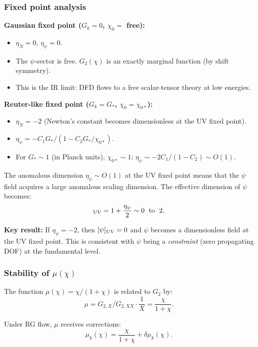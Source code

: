 \documentclass[11pt,a4paper]{article}
\begin{document}
\subsubsection{Fixed point analysis}

\textbf{Gaussian fixed point ($G_k = 0$, $\chi_0 = $ free):}
\begin{itemize}
\item $\eta_N = 0$, $\eta_\psi = 0$.
\item The $\psi$-sector is free. $G_2(\chi)$ is an exactly marginal function (by shift symmetry).
\item This is the IR limit: DFD flows to a free scalar-tensor theory at low energies.
\end{itemize}

\textbf{Reuter-like fixed point ($G_k = G_*$, $\chi_0 = \chi_{0*}$):}
\begin{itemize}
\item $\eta_N = -2$ (Newton's constant becomes dimensionless at the UV fixed point).
\item $\eta_\psi = -C_1 G_*/(1 - C_2 G_*/\chi_{0*})$.
\item For $G_* \sim 1$ (in Planck units), $\chi_{0*} \sim 1$: $\eta_\psi \sim -2C_1/(1-C_2) \sim O(1)$.
\end{itemize}

The anomalous dimension $\eta_\psi \sim O(1)$ at the UV fixed point means that the $\psi$ field acquires a large anomalous scaling dimension. The effective dimension of $\psi$ becomes:
\begin{equation}
[\psi]_{\rm UV} = 1 + \frac{\eta_\psi}{2} \sim 0 \;\text{ to }\; 2.
\end{equation}

\textbf{Key result:} If $\eta_\psi = -2$, then $[\psi]_{\rm UV} = 0$ and $\psi$ becomes a dimensionless field at the UV fixed point. This is consistent with $\psi$ being a \emph{constraint} (zero propagating DOF) at the fundamental level.

\subsubsection{Stability of $\mu(\chi)$}

The function $\mu(\chi) = \chi/(1+\chi)$ is related to $G_2$ by:
\begin{equation}
\mu = G_{2,X}/G_{2,XX} \cdot \frac{1}{X} = \frac{\chi}{1+\chi}.
\end{equation}

Under RG flow, $\mu$ receives corrections:
\begin{equation}
\mu_k(\chi) = \frac{\chi}{1+\chi} + \delta\mu_k(\chi).
\end{equation}
\end{document}
